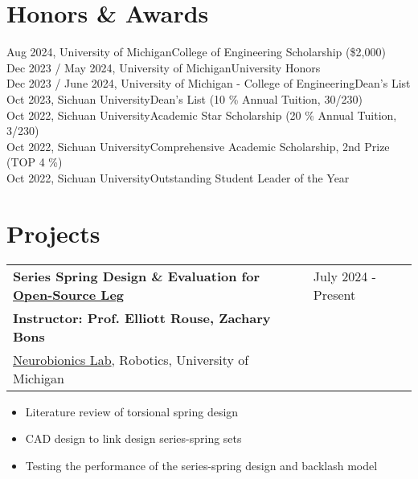 \documentclass[letter,12pt]{article}
\begin{document}
\section{Honors \& Awards}
Aug 2024, University of Michigan\hfill College of Engineering Scholarship (\$2,000)\\
Dec 2023 / May 2024, University of Michigan\hfill University Honors\\
Dec 2023 / June 2024, University of Michigan - College of Engineering\hfill Dean's List\\
Oct 2023, Sichuan University\hfill Dean's List (10 \% Annual Tuition, 30/230)\\
Oct 2022, Sichuan University\hfill Academic Star Scholarship (20 \% Annual Tuition, 3/230)\\
Oct 2022, Sichuan University\hfill Comprehensive Academic Scholarship, 2nd Prize (TOP 4 \%)\\
Oct 2022, Sichuan University\hfill Outstanding Student Leader of the Year\\



\section{Projects}

\begin{tabularx}{\linewidth}{@{}l X@{}}
    \large \textbf{Series Spring Design \& Evaluation for \href{https://www.opensourceleg.org/about}{Open-Source Leg}} & \hfill July 2024 - Present \\
    \small{\textbf{Instructor: Prof. Elliott Rouse, Zachary Bons}} & \hfill {} \\
    \small{\href{https://neurobionics.robotics.umich.edu/}{Neurobionics Lab}, Robotics, University of Michigan} & \hfill {} \\
    \end{tabularx}
    
    \begin{itemize}[
        rightmargin=2cm
    ]
        \setlength{\itemsep}{1pt}
        \setlength{\parskip}{0pt}
        \setlength{\parsep}{0pt}
        \item{\small Literature review of torsional spring design}
        \item{\small CAD design to link design series-spring sets}
        \item{\small Testing the performance of the series-spring design and backlash model}
    \end{itemize}
\end{document}
